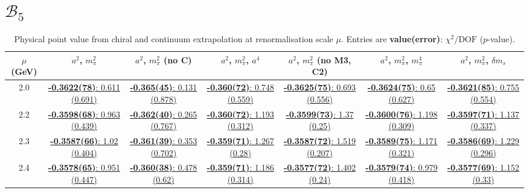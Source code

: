 \documentclass[12pt]{extarticle}
\begin{document}
\section{$\mathcal{B}_5$}
\begin{table}[h!]
\begin{center}
\begin{tabular}{|c|c|c|c|c|c|c|}
\hline
$\mu$ (GeV) & $a^2$, $m_\pi^2$& $a^2$, $m_\pi^2$ (no C)& $a^2$, $m_\pi^2$, $a^4$& $a^2$, $m_\pi^2$ (no M3, C2)& $a^2$, $m_\pi^2$, $m_\pi^4$& $a^2$, $m_\pi^2$, $\delta m_s$\\
\hline
2.0& \hyperlink{TT/NPR/a2m2_20.pdf.1}{\textbf{-0.3622(78)}: 0.611 (0.691)} & \hyperlink{TT/NPR/a2m2noC_20.pdf.1}{\textbf{-0.365(45)}: 0.131 (0.878)} & \hyperlink{TT/NPR/a2a4m2_20.pdf.1}{\textbf{-0.360(72)}: 0.748 (0.559)} & \hyperlink{TT/NPR/a2m2mcut_20.pdf.1}{\textbf{-0.3625(75)}: 0.693 (0.556)} & \hyperlink{TT/NPR/a2m2m4_20.pdf.1}{\textbf{-0.3624(75)}: 0.65 (0.627)} & \hyperlink{TT/NPR/a2m2delm_20.pdf.1}{\textbf{-0.3621(85)}: 0.755 (0.554)}\\
2.2& \hyperlink{TT/NPR/a2m2_22.pdf.1}{\textbf{-0.3598(68)}: 0.963 (0.439)} & \hyperlink{TT/NPR/a2m2noC_22.pdf.1}{\textbf{-0.362(40)}: 0.265 (0.767)} & \hyperlink{TT/NPR/a2a4m2_22.pdf.1}{\textbf{-0.360(72)}: 1.193 (0.312)} & \hyperlink{TT/NPR/a2m2mcut_22.pdf.1}{\textbf{-0.3599(73)}: 1.37 (0.25)} & \hyperlink{TT/NPR/a2m2m4_22.pdf.1}{\textbf{-0.3600(76)}: 1.198 (0.309)} & \hyperlink{TT/NPR/a2m2delm_22.pdf.1}{\textbf{-0.3597(71)}: 1.137 (0.337)}\\
2.3& \hyperlink{TT/NPR/a2m2_23.pdf.1}{\textbf{-0.3587(66)}: 1.02 (0.404)} & \hyperlink{TT/NPR/a2m2noC_23.pdf.1}{\textbf{-0.361(39)}: 0.353 (0.702)} & \hyperlink{TT/NPR/a2a4m2_23.pdf.1}{\textbf{-0.359(71)}: 1.267 (0.28)} & \hyperlink{TT/NPR/a2m2mcut_23.pdf.1}{\textbf{-0.3587(72)}: 1.519 (0.207)} & \hyperlink{TT/NPR/a2m2m4_23.pdf.1}{\textbf{-0.3589(75)}: 1.171 (0.321)} & \hyperlink{TT/NPR/a2m2delm_23.pdf.1}{\textbf{-0.3586(69)}: 1.229 (0.296)}\\
2.4& \hyperlink{TT/NPR/a2m2_24.pdf.1}{\textbf{-0.3578(65)}: 0.951 (0.447)} & \hyperlink{TT/NPR/a2m2noC_24.pdf.1}{\textbf{-0.360(38)}: 0.478 (0.62)} & \hyperlink{TT/NPR/a2a4m2_24.pdf.1}{\textbf{-0.359(71)}: 1.186 (0.314)} & \hyperlink{TT/NPR/a2m2mcut_24.pdf.1}{\textbf{-0.3577(72)}: 1.402 (0.24)} & \hyperlink{TT/NPR/a2m2m4_24.pdf.1}{\textbf{-0.3579(74)}: 0.979 (0.418)} & \hyperlink{TT/NPR/a2m2delm_24.pdf.1}{\textbf{-0.3577(69)}: 1.152 (0.33)}\\
\hline
\end{tabular}
\caption{Physical point value from chiral and continuum extrapolation at renormalisation scale $\mu$. Entries are \textbf{value(error)}: $\chi^2/\text{DOF}$ ($p$-value).}
\end{center}
\end{table}
\end{document}
